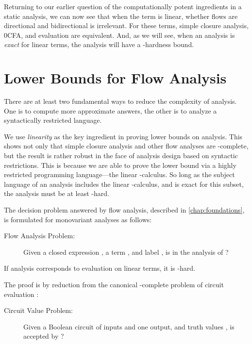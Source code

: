 Returning to our earlier question of the computationally potent
ingredients in a static analysis, we can now see that when the term is
linear, whether flows are directional and bidirectional is irrelevant.
For these terms, simple closure analysis, 0CFA, and evaluation are
equivalent.  And, as we will see, when an analysis is {\em exact} for
linear terms, the analysis will have a \ptime-hardness bound.



\section{Lower Bounds for Flow Analysis}
\label{sec:circuits}


There are at least two fundamental ways to reduce the complexity of
analysis.  One is to compute more approximate answers, the other is to
analyze a syntactically restricted language.

We use {\em linearity} as the key ingredient in proving lower bounds
on analysis.  This shows not only that simple closure analysis and
other flow analyses are \ptime-complete, but the result is rather
robust in the face of analysis design based on syntactic restrictions.
This is because we are able to prove the lower bound via a highly
restricted programming language---the linear -calculus.  So
long as the subject language of an analysis includes the linear
-calculus, and is exact for this subset, the analysis must be
at least \ptime-hard.

The decision problem answered by flow analysis, described in
\autoref{chap:foundations}, is formulated for monovariant analyses as
follows:
\begin{description}
\item[Flow Analysis Problem:] Given a closed expression , a term
, and label , is  in the analysis of ?
\end{description}

\begin{theorem}
If analysis corresponds to evaluation on linear terms, it is
\ptime-hard.
\end{theorem}
The proof is by reduction from the canonical \ptime-complete problem
of circuit evaluation \cite{ladner-75}:
\begin{description}
\item[Circuit Value Problem:] Given a Boolean circuit  of 
inputs and one output, and truth values , is
 accepted by ?
\end{description}

